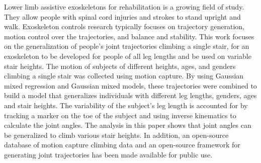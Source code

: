 

Lower limb assistive exoskeletons for rehabilitation is a growing field of study. They allow people with spinal cord injuries and strokes to stand upright and walk. Exoskeleton controls research typically focuses on trajectory generation, motion control over the trajectories, and balance and stability. This work focuses on the generalization of people's joint trajectories climbing a single stair, for an exoskeleton to be developed for people of all leg lengths and be used on variable stair heights. The motion of subjects of different heights, ages, and genders climbing a single stair was collected using motion capture. By using Gaussian mixed regression and Gaussian mixed models, these trajectories were combined to build a model that generalizes individuals with different leg lengths, genders, ages and stair heights. The variability of the subject's leg length is accounted for by tracking a marker on the toe of the subject and using inverse kinematics to calculate the joint angles. The analysis in this paper shows that joint angles can be generalized to climb various stair heights. In addition, an open-source database of motion capture climbing data and an open-source framework for generating joint trajectories has been made available for public use.







